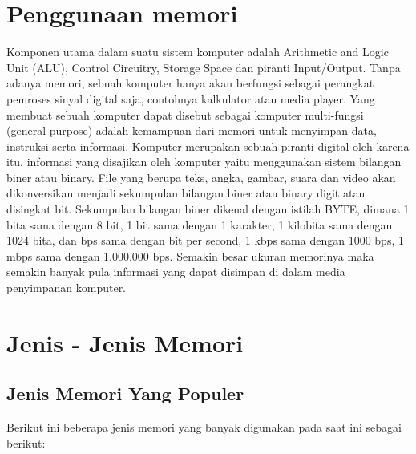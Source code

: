 \documentclass{article}
\begin{document}
\section{Penggunaan memori}
Komponen utama dalam suatu sistem komputer adalah Arithmetic and Logic Unit (ALU), Control Circuitry, Storage Space dan piranti Input/Output. Tanpa adanya memori, sebuah komputer hanya akan berfungsi sebagai perangkat pemroses sinyal digital saja, contohnya kalkulator atau media player. Yang membuat sebuah komputer dapat disebut sebagai komputer multi-fungsi (general-purpose)  adalah kemampuan  dari memori untuk menyimpan data, instruksi serta informasi. Komputer merupakan sebuah piranti digital oleh karena itu, informasi yang disajikan oleh komputer yaitu menggunakan sistem bilangan biner atau binary. File yang berupa teks, angka, gambar, suara dan video akan dikonversikan menjadi sekumpulan bilangan biner atau binary digit atau disingkat bit. Sekumpulan bilangan biner dikenal dengan istilah BYTE, dimana  1 bita sama dengan 8 bit, 1 bit sama dengan 1 karakter, 1 kilobita sama dengan 1024 bita, dan bps sama dengan bit per second, 1 kbps sama dengan 1000 bps, 1 mbps sama dengan 1.000.000 bps. Semakin besar ukuran memorinya maka semakin banyak pula informasi yang dapat disimpan di dalam media penyimpanan komputer.

\section{Jenis - Jenis Memori}

\subsection{Jenis Memori Yang Populer}

Berikut ini beberapa jenis memori yang banyak digunakan pada saat ini sebagai berikut:
\end{document}
